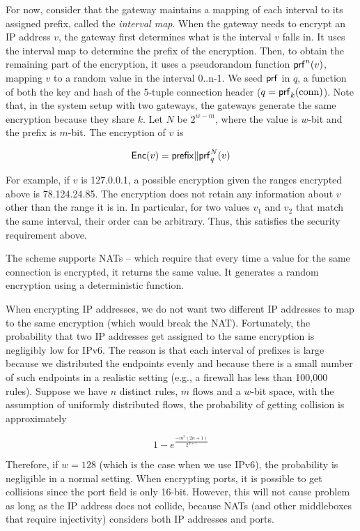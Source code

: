 For now, consider that the gateway maintains a mapping of each interval to its assigned prefix, called the {\em interval map}. When the gateway needs to encrypt an IP address $v$, the gateway first determines what is the interval $v$ falls in. It uses the interval map to determine the prefix of the encryption. Then, to obtain the remaining part of the encryption, it uses a pseudorandom function $\mathsf{prf}^n(v)$, mapping $v$ to a random value in the interval 0..n-1. We seed $\mathsf{prf}$ in $q$, a function of both the key and hash of the 5-tuple connection header ($q = \mathsf{prf}_k(\text{conn})$). Note that, in the system setup with two gateways, the gateways generate the same encryption because they share $k$. Let $N$ be $2^{w-m}$, where the value is $w$-bit and the prefix is $m$-bit. The encryption of $v$ is

\begin{equation}
\mathsf{Enc}(v) = \mathsf{prefix} \Vert \mathsf{prf}_q^N(v)
\end{equation}

For example, if $v$ is 127.0.0.1, a possible encryption given the ranges encrypted above is 78.124.24.85. The encryption does not retain any information about $v$ other than the range it is in. In particular, for two values $v_1$ and $v_2$ that match the same interval, their order can be arbitrary. Thus, this satisfies the security requirement above.

The scheme supports NATs -- which require that every time a value for the same connection is encrypted, it returns the same value. It generates a random encryption using a deterministic function. 

When encrypting IP addresses, we do not want two different IP addresses to map to the same encryption (which would break the NAT). Fortunately, the probability that two IP addresses get assigned to the same encryption is negligibly low for IPv6.  The reason is that each interval of prefixes is large because we distributed the endpoints evenly and because there is a small number of such endpoints in a realistic setting (e.g., a firewall has less than 100,000 rules). Suppose we have $n$ distinct rules, $m$ flows and a $w$-bit space, with the assumption of uniformly distributed flows, the probability of getting collision is approximately 

\begin{equation}
1 - e^\frac{-m^2 (2n+1)}{2^{w+1}}
\end{equation}

Therefore, if $w=128$ (which is the case when we use IPv6), the probability is negligible in a normal setting. When encrypting ports, it is possible to get collisions since the port field is only 16-bit. However, this will not cause problem as long as the IP address does not collide, because NATs (and other middleboxes that require injectivity) considers both IP addresses and ports.

